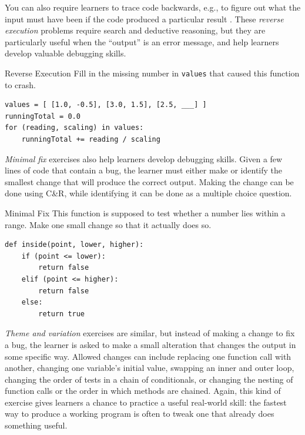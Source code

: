 You can also require learners to trace code backwards, e.g., to figure
out what the input must have been if the code produced a particular
result \cite{Armo2008}. These \emph{reverse execution} problems require
search and deductive reasoning, but they are particularly useful when
the ``output'' is an error message, and help learners develop valuable
debugging skills.

\begin{aside}{Reverse Execution}
  Fill in the missing number in \texttt{values} that caused this function to
  crash.

\begin{verbatim}
values = [ [1.0, -0.5], [3.0, 1.5], [2.5, ___] ]
runningTotal = 0.0
for (reading, scaling) in values:
    runningTotal += reading / scaling
\end{verbatim}
\end{aside}

\emph{Minimal fix} exercises also help learners develop debugging skills.
Given a few lines of code that contain a bug, the learner must either
make or identify the smallest change that will produce the correct
output. Making the change can be done using C\&R, while identifying it
can be done as a multiple choice question.

\begin{aside}{Minimal Fix}
  This function is supposed to test whether a number lies within a
  range. Make one small change so that it actually does so.

\begin{verbatim}
def inside(point, lower, higher):
    if (point <= lower):
        return false
    elif (point <= higher):
        return false
    else:
        return true
\end{verbatim}
\end{aside}

\emph{Theme and variation} exercises are similar, but instead of making a
change to fix a bug, the learner is asked to make a small alteration
that changes the output in some specific way. Allowed changes can
include replacing one function call with another, changing one
variable's initial value, swapping an inner and outer loop, changing
the order of tests in a chain of conditionals, or changing the nesting
of function calls or the order in which methods are chained. Again, this
kind of exercise gives learners a chance to practice a useful real-world
skill: the fastest way to produce a working program is often to tweak
one that already does something useful.


